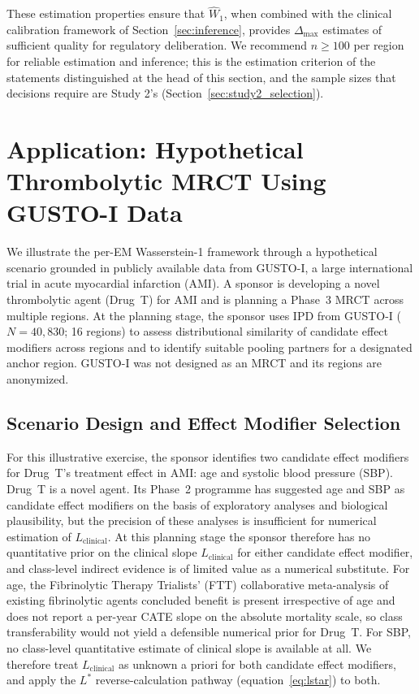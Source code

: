 \documentclass[AMA,Times1COL]{WileyNJDv5}
\begin{document}
These estimation properties ensure that $\widehat{W}_1$, when combined with the clinical calibration framework of Section~\ref{sec:inference}, provides $\Delta_{\max}$ estimates of sufficient quality for regulatory deliberation. We recommend $n \geq 100$ per region for reliable estimation and inference; this is the estimation criterion of the statements distinguished at the head of this section, and the sample sizes that decisions require are Study 2's (Section~\ref{sec:study2_selection}).

\section{Application: Hypothetical Thrombolytic MRCT Using GUSTO-I Data}\label{sec:application}

We illustrate the per-EM Wasserstein-1 framework through a hypothetical scenario grounded in publicly available data from GUSTO-I, a large international trial in acute myocardial infarction (AMI). A sponsor is developing a novel thrombolytic agent (Drug~T) for AMI and is planning a Phase~3 MRCT across multiple regions. At the planning stage, the sponsor uses IPD from GUSTO-I ($N = 40{,}830$; 16 regions)\cite{gusto1993} to assess distributional similarity of candidate effect modifiers across regions and to identify suitable pooling partners for a designated anchor region. GUSTO-I was not designed as an MRCT and its regions are anonymized.

\subsection{Scenario Design and Effect Modifier Selection}\label{sec:app_scenario}

For this illustrative exercise, the sponsor identifies two candidate effect modifiers for Drug~T's treatment effect in AMI: age and systolic blood pressure (SBP). Drug~T is a novel agent. Its Phase~2 programme has suggested age and SBP as candidate effect modifiers on the basis of exploratory analyses and biological plausibility, but the precision of these analyses is insufficient for numerical estimation of $L_{\text{clinical}}$. At this planning stage the sponsor therefore has no quantitative prior on the clinical slope $L_{\text{clinical}}$ for either candidate effect modifier, and class-level indirect evidence is of limited value as a numerical substitute. For age, the Fibrinolytic Therapy Trialists' (FTT) collaborative meta-analysis of existing fibrinolytic agents\cite{ftt1994} concluded benefit is present irrespective of age and does not report a per-year CATE slope on the absolute mortality scale, so class transferability would not yield a defensible numerical prior for Drug~T. For SBP, no class-level quantitative estimate of clinical slope is available at all. We therefore treat $L_{\text{clinical}}$ as unknown a priori for both candidate effect modifiers, and apply the $L^*$ reverse-calculation pathway (equation~\ref{eq:lstar}) to both.
\end{document}
